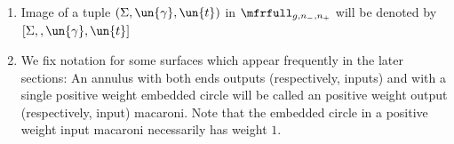 \documentclass[a4paper,10pt]{amsart}
\begin{document}
\begin{notation}
\begin{enumerate}
	\item Image of a tuple $(\Sigma,\un{\gamma},\un{t})$ in $\mfrfull_{g,n_-,n_+}$ will be denoted by $[\Sigma,,\un{\gamma},\un{t}]$
	\item We fix notation for some surfaces which appear frequently in the later sections: An annulus with both ends outputs (respectively, inputs) and with a single positive weight embedded circle will be called an positive weight output (respectively, input) macaroni. Note that the embedded circle in a positive weight input macaroni necessarily has weight $1$.
\end{enumerate}
\end{notation}
\end{document}
